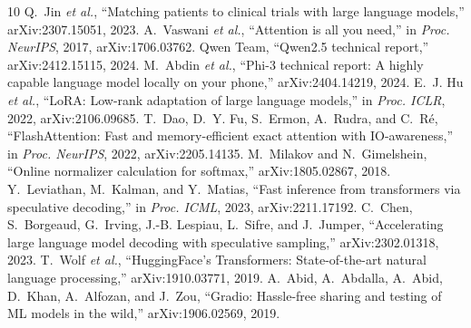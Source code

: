 \documentclass[conference]{IEEEtran}
\begin{document}
\begin{thebibliography}{10}
 Q.~Jin \emph{et al.}, ``Matching patients to clinical trials with large language models,'' arXiv:2307.15051, 2023.
 A.~Vaswani \emph{et al.}, ``Attention is all you need,'' in \emph{Proc. NeurIPS}, 2017, arXiv:1706.03762.
 Qwen Team, ``Qwen2.5 technical report,'' arXiv:2412.15115, 2024.
 M.~Abdin \emph{et al.}, ``Phi-3 technical report: A highly capable language model locally on your phone,'' arXiv:2404.14219, 2024.
 E.~J. Hu \emph{et al.}, ``LoRA: Low-rank adaptation of large language models,'' in \emph{Proc. ICLR}, 2022, arXiv:2106.09685.
 T.~Dao, D.~Y. Fu, S.~Ermon, A.~Rudra, and C.~R\'e, ``FlashAttention: Fast and memory-efficient exact attention with IO-awareness,'' in \emph{Proc. NeurIPS}, 2022, arXiv:2205.14135.
 M.~Milakov and N.~Gimelshein, ``Online normalizer calculation for softmax,'' arXiv:1805.02867, 2018.
 Y.~Leviathan, M.~Kalman, and Y.~Matias, ``Fast inference from transformers via speculative decoding,'' in \emph{Proc. ICML}, 2023, arXiv:2211.17192.
 C.~Chen, S.~Borgeaud, G.~Irving, J.-B. Lespiau, L.~Sifre, and J.~Jumper, ``Accelerating large language model decoding with speculative sampling,'' arXiv:2302.01318, 2023.
 T.~Wolf \emph{et al.}, ``HuggingFace's Transformers: State-of-the-art natural language processing,'' arXiv:1910.03771, 2019.
 A.~Abid, A.~Abdalla, A.~Abid, D.~Khan, A.~Alfozan, and J.~Zou, ``Gradio: Hassle-free sharing and testing of ML models in the wild,'' arXiv:1906.02569, 2019.
\end{thebibliography}
\end{document}
